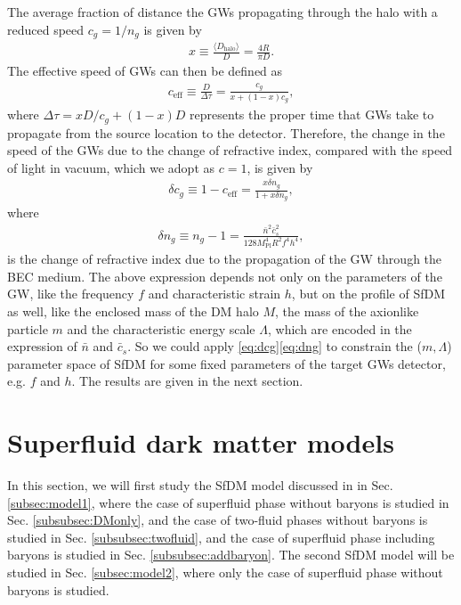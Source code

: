 \documentclass[aps,prd,twocolumn,10pt,groupedaddress]{revtex4-1}
\begin{document}
The average fraction of distance the GWs propagating through the halo with a reduced speed $c_{g}=1/n_{g}$ is given by
\begin{align}
x\equiv\frac{\langle D_{\mathrm{halo}}\rangle}{D}=\frac{4R}{\pi D}.
\end{align}
The effective speed of GWs can then be defined as
\begin{align}
c_{\text{eff}}\equiv\frac{D}{\Delta\tau}=\frac{c_{g}}{x+(1-x)c_{g}},
\end{align}
where $\Delta\tau=xD/c_{g}+(1-x)D$ represents the proper time that GWs take to propagate from the source location to the detector. Therefore, the change in the speed of the GWs due to the change of refractive index, compared with the speed of light in vacuum, which we adopt as $c=1$,  is given by
\begin{align}\label{eq:dcg}
\delta c_{g}\equiv 1-c_{\text{eff}}=\frac{x\delta n_{g}}{1+x\delta n_{g}},
\end{align}
where
\begin{align}\label{eq:dng}
\delta n_{g}\equiv n_{g}-1=\frac{\bar{n}^{2}\bar{c}_{s}^{2}}{128M_\mathrm{Pl}^{4}R^{2}f^{4}h^{4}},
\end{align}
is the change of refractive index due to the propagation of the GW through the BEC medium. The above expression depends not only on the parameters of the GW, like the frequency $f$ and characteristic strain $h$, but on the profile of SfDM as well, like the enclosed mass of the DM halo $M$, the mass of the axionlike particle $m$ and the characteristic energy scale $\Lambda$, which are encoded in the expression of $\bar{n}$ and $\bar{c}_{s}$. So we could apply \eqref{eq:dcg}\eqref{eq:dng} to constrain the ($m, \Lambda$) parameter space of SfDM for some fixed parameters of the target GWs detector, e.g.  $f$ and $h$. The results are given in the next section.

\section{Superfluid dark matter models} \label{sec:SfDM}

In this section, we will first study the SfDM model discussed in \cite{Berezhiani:2015bqa} in Sec. \ref{subsec:model1}, where the case of superfluid phase without baryons is studied in Sec. \ref{subsubsec:DMonly}, and the case of two-fluid phases without baryons is studied in Sec. \ref{subsubsec:twofluid}, and the case of superfluid phase including baryons is studied in Sec. \ref{subsubsec:addbaryon}. The second SfDM model \cite{Khoury:2016ehj} will be  studied in Sec. \ref{subsec:model2}, where only the case of superfluid phase without baryons is studied.
\end{document}
